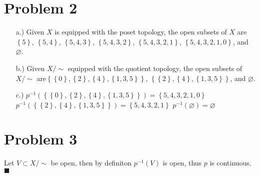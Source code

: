 \documentclass[12pt]{article}
\newcommand{\braces}[1]{\left\{#1\right\}}           %
\begin{document}
\section*{Problem 2}
\begin{itemize}
    \item [a.)] Given $X$ is equipped with the poset topology, the open subsets of $X$ are $\braces{5}$, $\braces{5,4}$, $\braces{5,4,3}$, $\braces{5,4,3,2}$, $\braces{5,4,3,2,1}$, $\braces{5,4,3,2,1,0}$, and $\varnothing$.

    \item [b.)] Given $X/{\sim}$ equipped with the quotient topology, the open subsets of $X/{\sim}$ are\break$\braces{\braces{0},\braces{2},\braces{4},\braces{1,3,5}}$, $\braces{\braces{2},\braces{4},\braces{1,3,5}}$, and $\varnothing$.

    \item [c.)] $p^{-1}(\braces{\braces{0},\braces{2},\braces{4},\braces{1,3,5}})=\braces{5,4,3,2,1,0}$\newline
    $p^{-1}(\braces{\braces{2},\braces{4},\braces{1,3,5}})=\braces{5,4,3,2,1}$\newline
    $p^{-1}(\varnothing)=\varnothing$

\end{itemize}

\section*{Problem 3}
Let $V\subset X/{\sim}$ be open, then by definiton $p^{-1}(V)$ is open, thus $p$ is continuous. $\blacksquare$
\end{document}
